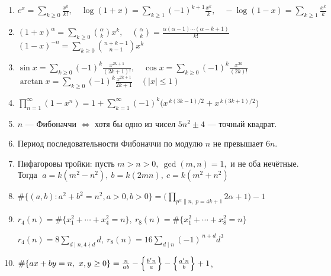 \begin{enumerate}
\item %
$\displaystyle e^x=\sum_{k\ge0}\frac{x^k}{k!},\quad
\log(1+x)=\sum_{k\ge1}(-1)^{k+1}\frac{x^k}{k},\quad
-\log(1-x)=\sum_{k\ge1}\frac{x^k}{k}$

\item %
$\displaystyle (1+x)^\alpha=\sum_{k\ge0}\binom{\alpha}{k}x^k,\quad
\binom{\alpha}{k}=\frac{\alpha(\alpha-1)\cdots(\alpha-k+1)}{k!}$
\\ $\displaystyle (1-x)^{-n}=\sum_{k\ge0}\binom{n+k-1}{n-1}x^k$

\item %
$\displaystyle \sin x=\sum_{k\ge0}(-1)^k\frac{x^{2k+1}}{(2k+1)!},\quad
\cos x=\sum_{k\ge0}(-1)^k\frac{x^{2k}}{(2k)!}$
\\ $\displaystyle \arctan x=\sum_{k\ge0}(-1)^k\frac{x^{2k+1}}{2k+1}\quad(|x|\le1)$

\item %
$\prod_{n=1}^\infty(1-x^n)=1+\sum_{k=1}^{\infty}(-1)^k\bigl(x^{\,k(3k-1)/2}+x^{\,k(3k+1)/2}\bigr)$

\item %
$n$ — Фибоначчи $\iff$ хотя бы одно из чисел $5n^2\pm4$ — точный квадрат.

\item %
Период последовательности Фибоначчи по модулю $n$ не превышает $6n$.

\item %
Пифагоровы тройки: пусть $m>n>0,\ \gcd(m,n)=1,$ и не оба нечётные. Тогда
$\;a=k(m^2-n^2),\ b=k(2mn),\ c=k(m^2+n^2)$


\item %
$\displaystyle \#\{(a,b):a^2+b^2=n^2,a>0,b>0\}
=\Big(\prod_{p^\alpha\parallel n,\ p = 4k+1}2\alpha+1\Big)-1$

\item %
$r_4(n)=\#\{x_1^2+\cdots+x_4^2=n\},\ 
r_8(n)=\#\{x_1^2+\cdots+x_8^2=n\}$

$r_4(n)=8\sum_{d\mid n, 4\nmid d}d,\ 
r_8(n)=16\sum_{d\mid n}(-1)^{\,n+d}d^3$

\item %
$\#\{ax+by=n,\ x,y\ge0\}=\frac{n}{ab}-\Bigl\{\tfrac{b'n}{a}\Bigr\}-\Bigl\{\tfrac{a'n}{b}\Bigr\}+1$,


\end{enumerate}
